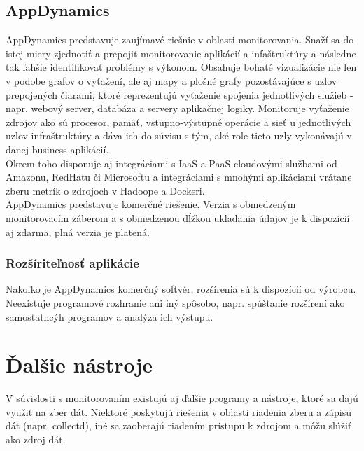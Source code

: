 \documentclass[11pt,final,oneside]{fithesis}
\begin{document}
\subsection{AppDynamics}
AppDynamics predstavuje zaujímavé riešnie v oblasti monitorovania. Snaží sa do istej miery zjednotiť a prepojiť monitorovanie aplikácií 
a infaštruktúry a následne tak ľahšie identifikovať problémy s výkonom. Obsahuje bohaté vizualizácie nie len v podobe grafov o vyťažení,
ale aj mapy a plošné grafy pozostávajúce s uzlov prepojených čiarami, ktoré reprezentujú vyťaženie spojenia jednotlivých služieb - 
napr. webový server, databáza a servery aplikačnej logiky. Monitoruje vyťaženie zdrojov ako sú procesor, pamäť, vstupno-výstupné operácie
a sieť u jednotlivých uzlov infraštruktúry a dáva ich do súvisu s tým, aké role tieto uzly vykonávajú v danej business aplikácií.
\\Okrem toho disponuje aj integráciami s IaaS a PaaS cloudovými službami od Amazonu, RedHatu či Microsoftu a integráciami s mnohými aplikáciami
vrátane zberu metrík o zdrojoch v Hadoope a Dockeri.\cite{17}
\\AppDynamics predstavuje komerčné riešenie. Verzia s obmedzeným monitorovacím záberom a s obmedzenou dĺžkou ukladania údajov je k 
dispozícií aj zdarma, plná verzia je platená.

\subsubsection{Rozšíriteľnosť aplikácie}
Nakoľko je AppDynamics komerčný softvér, rozšírenia sú k dispozícií od výrobcu. Neexistuje programové rozhranie ani iný spôsobo, napr. spúšťanie rozšírení ako samostatncýh programov a analýza 
ich výstupu.

\section{Ďalšie nástroje}
V súvislosti s monitorovaním existujú aj ďalšie programy a nástroje, ktoré sa dajú využiť na zber dát. Niektoré poskytujú riešenia v oblasti riadenia zberu a zápisu dát (napr. collectd), iné
sa zaoberajú riadením prístupu k zdrojom a môžu slúžiť ako zdroj dát.
\end{document}
